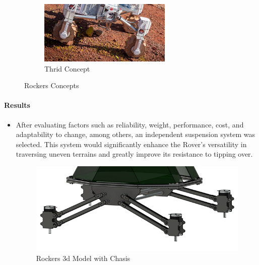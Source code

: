 \documentclass{article}
\begin{document}
\begin{itemize}
\begin{figure}[H]
\begin{subfigure}{.3\textwidth}
        \end{subfigure}
        \begin{subfigure}{.3\textwidth}
            \centering
            \includegraphics[width=.9\linewidth]{Images/Rockers/Concept3.png}
            \caption{Thrid Concept}
            
          \end{subfigure}
        \caption{Rockers Concepts}
        
    \end{figure}

\end{itemize}
\paragraph[short]{Results}
\begin{itemize}

    \item After evaluating factors such as reliability, weight, performance, cost, and adaptability to change, among others, an independent suspension system was selected. This system would significantly enhance the Rover's versatility in traversing uneven terrains and greatly improve its resistance to tipping over.
    \begin{figure}[H]
        \centering
        \includegraphics[width=\linewidth]{Images/Rockers/RockersV1.png}
        \caption{Rockers 3d Model with Chasis}
    \end{figure}
\end{itemize}
\end{document}
